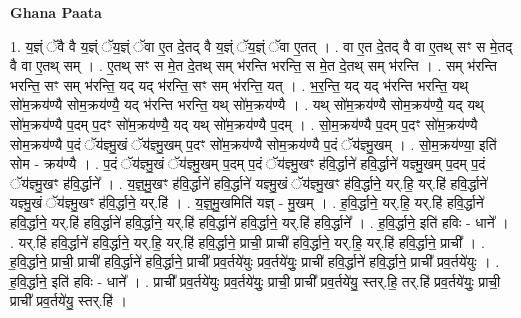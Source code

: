 \documentclass[17pt]{extarticle}
\begin{document}
\textbf{Ghana Paata } \newline

1. य॒ज्ञ्ं ॅवै वै य॒ज्ञ्ं ॅय॒ज्ञ्ं ॅवा ए॒त दे॒तद् वै य॒ज्ञ्ं ॅय॒ज्ञ्ं ॅवा ए॒तत् । . वा ए॒त दे॒तद् वै वा ए॒तथ् सꣳ स मे॒तद् वै वा ए॒तथ् सम् । . ए॒तथ् सꣳ स मे॒त दे॒तथ् सम् भ॑रन्ति भरन्ति॒ स मे॒त दे॒तथ् सम् भ॑रन्ति । . सम् भ॑रन्ति भरन्ति॒ सꣳ सम् भ॑रन्ति॒ यद् यद् भ॑रन्ति॒ सꣳ सम् भ॑रन्ति॒ यत् । . भ॒र॒न्ति॒ यद् यद् भ॑रन्ति भरन्ति॒ यथ् सो॑म॒क्रय॑ण्यै सोम॒क्रय॑ण्यै॒ यद् भ॑रन्ति भरन्ति॒ यथ् सो॑म॒क्रय॑ण्यै । . यथ् सो॑म॒क्रय॑ण्यै सोम॒क्रय॑ण्यै॒ यद् यथ् सो॑म॒क्रय॑ण्यै प॒दम् प॒दꣳ सो॑म॒क्रय॑ण्यै॒ यद् यथ् सो॑म॒क्रय॑ण्यै प॒दम् । . सो॒म॒क्रय॑ण्यै प॒दम् प॒दꣳ सो॑म॒क्रय॑ण्यै सोम॒क्रय॑ण्यै प॒दं ॅय॑ज्ञ्मु॒खं ॅय॑ज्ञ्मु॒खम् प॒दꣳ सो॑म॒क्रय॑ण्यै सोम॒क्रय॑ण्यै प॒दं ॅय॑ज्ञ्मु॒खम् । . सो॒म॒क्रय॑ण्या॒ इति॑ सोम - क्रय॑ण्यै । . प॒दं ॅय॑ज्ञ्मु॒खं ॅय॑ज्ञ्मु॒खम् प॒दम् प॒दं ॅय॑ज्ञ्मु॒खꣳ ह॑वि॒र्द्धाने॑ हवि॒र्द्धाने॑ यज्ञ्मु॒खम् प॒दम् प॒दं ॅय॑ज्ञ्मु॒खꣳ ह॑वि॒र्द्धाने᳚ । . य॒ज्ञ्॒मु॒खꣳ ह॑वि॒र्द्धाने॑ हवि॒र्द्धाने॑ यज्ञ्मु॒खं ॅय॑ज्ञ्मु॒खꣳ ह॑वि॒र्द्धाने॒ यर्.हि॒ यर्.हि॑ हवि॒र्द्धाने॑ यज्ञ्मु॒खं ॅय॑ज्ञ्मु॒खꣳ ह॑वि॒र्द्धाने॒ यर्.हि॑ । . य॒ज्ञ्॒मु॒खमिति॑ यज्ञ् - मु॒खम् । . ह॒वि॒र्द्धाने॒ यर्.हि॒ यर्.हि॑ हवि॒र्द्धाने॑ हवि॒र्द्धाने॒ यर्.हि॑ हवि॒र्द्धाने॑ हवि॒र्द्धाने॒ यर्.हि॑ हवि॒र्द्धाने॑ हवि॒र्द्धाने॒ यर्.हि॑ हवि॒र्द्धाने᳚ । . ह॒वि॒र्द्धाने॒ इति॑ हविः - धाने᳚ । . यर्.हि॑ हवि॒र्द्धाने॑ हवि॒र्द्धाने॒ यर्.हि॒ यर्.हि॑ हवि॒र्द्धाने॒ प्राची॒ प्राची॑ हवि॒र्द्धाने॒ यर्.हि॒ यर्.हि॑ हवि॒र्द्धाने॒ प्राची᳚ । . ह॒वि॒र्द्धाने॒ प्राची॒ प्राची॑ हवि॒र्द्धाने॑ हवि॒र्द्धाने॒ प्राची᳚ प्रव॒र्तये॑युः प्रव॒र्तये॑युः॒ प्राची॑ हवि॒र्द्धाने॑ हवि॒र्द्धाने॒ प्राची᳚ प्रव॒र्तये॑युः । . ह॒वि॒र्द्धाने॒ इति॑ हविः - धाने᳚ । . प्राची᳚ प्रव॒र्तये॑युः प्रव॒र्तये॑युः॒ प्राची॒ प्राची᳚ प्रव॒र्तये॑यु॒ स्तर्.हि॒ तर्.हि॑ प्रव॒र्तये॑युः॒ प्राची॒ प्राची᳚ प्रव॒र्तये॑यु॒ स्तर्.हि॑ । \newline
\end{document}
